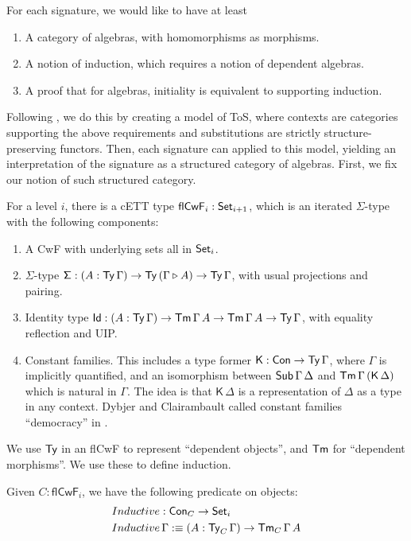 \documentclass{llncs}
\newcommand{\ext}{\triangleright}
\newcommand{\Sg}{\mathsf{\Sigma}}
\newcommand{\flCwF}{\mathsf{flCwF}}
\newcommand{\Kfam}{\mathsf{K}}
\begin{document}
For each signature, we would like to have at least
\begin{enumerate}
  \item A category of algebras, with homomorphisms as morphisms.
  \item A notion of induction, which requires a notion of dependent algebras.
  \item A proof that for algebras, initiality is equivalent to supporting induction.
\end{enumerate}

Following \cite{TODO}, we do this by creating a model of ToS, where contexts are
categories supporting the above requirements and substitutions are strictly
structure-preserving functors. Then, each signature can applied to this model,
yielding an interpretation of the signature as a structured category of
algebras. First, we fix our notion of such structured category.

\begin{nidefinition}\label{def:flCwF}
For a level $i$, there is a cETT type $\flCwF_i : \Set_{i+1}$, which is an
iterated $\Sigma$-type with the following components:
\begin{enumerate}
  \item A CwF with underlying sets all in $\mathsf{Set}_i$.
  \item $\Sigma$-type $\Sg : (A : \Ty\,\Gamma)\ra \Ty\,(\Gamma \ext A)
    \ra \Ty\,\Gamma$, with usual projections and pairing.
  \item Identity type $\mathsf{Id} : (A : \mathsf{Ty}\,\Gamma)\rightarrow \mathsf{Tm}\,\Gamma\,A\rightarrow
    \mathsf{Tm}\,\Gamma\,A\rightarrow \mathsf{Ty}\,\Gamma$, with equality reflection and UIP.
  \item Constant families. This includes a type former $\Kfam : \Con \ra
    \Ty\,\Gamma$, where $\Gamma$ is implicitly quantified, and an isomorphism
    between $\mathsf{Sub}\,\Gamma\,\Delta$ and $\Tm\,\Gamma\,(\Kfam\,\Delta)$ which is
    natural in $\Gamma$. The idea is that $\Kfam\,\Delta$ is a representation
    of $\Delta$ as a type in any context. Dybjer and Clairambault called constant
    families ``democracy'' in \cite{TODO}.
\end{enumerate}
\end{nidefinition}

We use $\mathsf{Ty}$ in an flCwF to represent ``dependent objects'', and $\mathsf{Tm}$
for ``dependent morphisms''. We use these to define induction.

\begin{nidefinition}
Given $C : \flCwF_i$, we have the following predicate on objects:
\begin{alignat*}{3}
  & Inductive : \mathsf{Con}_C \rightarrow \mathsf{Set}_i \\
  & Inductive\,\Gamma :\equiv (A : \mathsf{Ty}_C\,\Gamma)\rightarrow \mathsf{Tm}_C\,\Gamma\,A
\end{alignat*}
\end{nidefinition}
\end{document}
